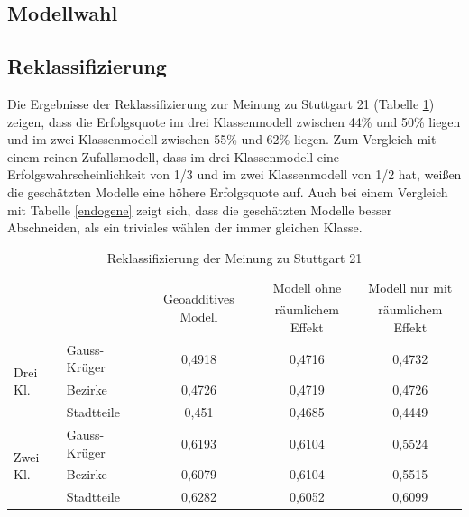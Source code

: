 \documentclass{Vorlage}
\begin{document}
\subsection{Modellwahl}

\subsection{Reklassifizierung}

Die Ergebnisse der Reklassifizierung zur Meinung zu Stuttgart 21 (Tabelle \ref{evalS21}) zeigen, dass die Erfolgsquote im drei Klassenmodell zwischen 44\% und 50\% liegen und im zwei Klassenmodell zwischen 55\% und 62\% liegen. Zum Vergleich mit einem reinen Zufallsmodell, dass im drei Klassenmodell eine Erfolgswahrscheinlichkeit von 1/3 und im zwei Klassenmodell von 1/2 hat, weißen die geschätzten Modelle eine höhere Erfolgsquote auf. Auch bei einem Vergleich mit Tabelle \ref{endogene} zeigt sich, dass die geschätzten Modelle besser Abschneiden, als ein triviales wählen der immer gleichen Klasse.

\begin{table}[h]
\centering
\caption{Reklassifizierung der Meinung zu Stuttgart 21}
\label{evalS21}
\begin{tabular}{ll|c|c|c}
\hline \hline
                          &              & \multirow{2}{*}{Geoadditives Modell} & Modell ohne       & Modell nur mit    \\
                          &              &                                      & räumlichem Effekt & räumlichem Effekt \\ \hline
\multirow{3}{*}{Drei Kl.} & Gauss-Krüger & 0,4918                               & 0,4716            & 0,4732            \\
                          & Bezirke      & 0,4726                               & 0,4719            & 0,4726            \\
                          & Stadtteile   & 0,451                                & 0,4685            & 0,4449            \\ \hline
\multirow{3}{*}{Zwei Kl.} & Gauss-Krüger & 0,6193                               & 0,6104            & 0,5524            \\
                          & Bezirke      & 0,6079                               & 0,6104            & 0,5515            \\
                          & Stadtteile   & 0,6282                               & 0,6052            & 0,6099            \\ \hline \hline
\end{tabular}
\end{table}
\end{document}
